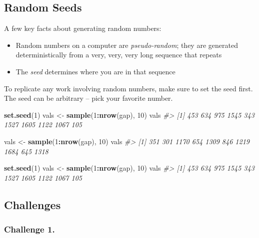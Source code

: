 \documentclass[]{book}
\newenvironment{Shaded}{\begin{snugshade}}{\end{snugshade}}
\newcommand{\KeywordTok}[1]{\textcolor[rgb]{0.13,0.29,0.53}{\textbf{#1}}}
\newcommand{\DecValTok}[1]{\textcolor[rgb]{0.00,0.00,0.81}{#1}}
\newcommand{\StringTok}[1]{\textcolor[rgb]{0.31,0.60,0.02}{#1}}
\newcommand{\CommentTok}[1]{\textcolor[rgb]{0.56,0.35,0.01}{\textit{#1}}}
\newcommand{\OperatorTok}[1]{\textcolor[rgb]{0.81,0.36,0.00}{\textbf{#1}}}
\newcommand{\NormalTok}[1]{#1}
\providecommand{\tightlist}{%
  \setlength{\itemsep}{0pt}\setlength{\parskip}{0pt}}
\begin{document}
\subsection{Random Seeds}\label{random-seeds}

A few key facts about generating random numbers:

\begin{itemize}
\tightlist
\item
  Random numbers on a computer are \emph{pseudo-random}; they are
  generated deterministically from a very, very, very long sequence that
  repeats
\item
  The \emph{seed} determines where you are in that sequence
\end{itemize}

To replicate any work involving random numbers, make sure to set the
seed first. The seed can be arbitrary -- pick your favorite number.

\begin{Shaded}
\begin{Highlighting}[]
\KeywordTok{set.seed}\NormalTok{(}\DecValTok{1}\NormalTok{)}
\NormalTok{vals <-}\StringTok{ }\KeywordTok{sample}\NormalTok{(}\DecValTok{1}\OperatorTok{:}\KeywordTok{nrow}\NormalTok{(gap), }\DecValTok{10}\NormalTok{)}
\NormalTok{vals}
\CommentTok{#>  [1]  453  634  975 1545  343 1527 1605 1122 1067  105}

\NormalTok{vals <-}\StringTok{ }\KeywordTok{sample}\NormalTok{(}\DecValTok{1}\OperatorTok{:}\KeywordTok{nrow}\NormalTok{(gap), }\DecValTok{10}\NormalTok{)}
\NormalTok{vals}
\CommentTok{#>  [1]  351  301 1170  654 1309  846 1219 1684  645 1318}

\KeywordTok{set.seed}\NormalTok{(}\DecValTok{1}\NormalTok{)}
\NormalTok{vals <-}\StringTok{ }\KeywordTok{sample}\NormalTok{(}\DecValTok{1}\OperatorTok{:}\KeywordTok{nrow}\NormalTok{(gap), }\DecValTok{10}\NormalTok{)}
\NormalTok{vals}
\CommentTok{#>  [1]  453  634  975 1545  343 1527 1605 1122 1067  105}
\end{Highlighting}
\end{Shaded}

\subsection{Challenges}\label{challenges-13}

\subsubsection*{Challenge 1.}\label{challenge-1.-9}
\end{document}

